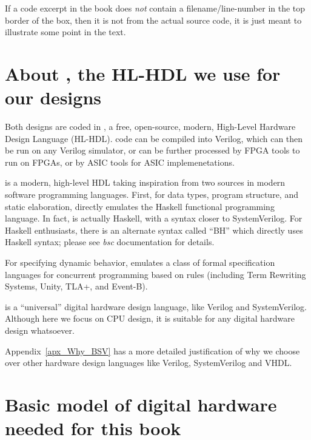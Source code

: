 If a code excerpt in the book does \emph{not} contain a
filename/line-number in the top border of the box, then it is not from
the actual source code, it is just meant to illustrate some point in
the text.


\section{About {\BSV}, the HL-HDL we use for our designs}

Both designs are coded in {\BSV}, a free, open-source, modern, High-Level
Hardware Design Language (HL-HDL).  {\BSV} code can be compiled into
Verilog, which can then be run on any Verilog simulator, or can be
further processed by FPGA tools to run on FPGAs, or by ASIC tools for
ASIC implemenetations.


{\BSV} is a modern, high-level HDL taking inspiration from two sources in
modern software programming languages.  First, for data types, program
structure, and static elaboration, {\BSV} directly emulates the Haskell
functional programming language.  In fact, {\BSV} is actually Haskell,
with a syntax closer to SystemVerilog.  For Haskell enthusiasts, there
is an alternate syntax called ``BH'' which directly uses Haskell
syntax; please see \emph{bsc} documentation for details.

For specifying dynamic behavior, {\BSV} emulates a class of formal
specification languages for concurrent programming based on rules
(including Term Rewriting Systems, Unity, TLA+, and Event-B).

{\BSV} is a ``universal'' digital hardware design language, like Verilog
and SystemVerilog.  Although here we focus on CPU design, it is
suitable for any digital hardware design whatsoever.

Appendix~\ref{apx_Why_BSV} has a more detailed justification of why we
choose {\BSV} over other hardware design languages like Verilog,
SystemVerilog and VHDL.


\section{Basic model of digital hardware needed for this book}

